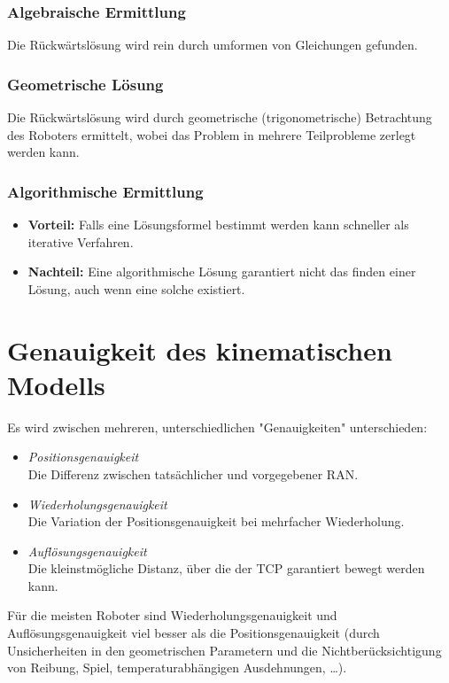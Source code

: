 			\subsubsection{Algebraische Ermittlung}
				Die Rückwärtslösung wird rein durch umformen von Gleichungen gefunden.
			
			\subsubsection{Geometrische Lösung}
				Die Rückwärtslösung wird durch geometrische (\bspw trigonometrische) Betrachtung des Roboters ermittelt, wobei das Problem in mehrere Teilprobleme zerlegt werden kann.
			
			\subsubsection{Algorithmische Ermittlung}
				\begin{itemize}
					\item \textbf{Vorteil:} Falls eine Lösungsformel bestimmt werden kann schneller als iterative Verfahren.
					\item \textbf{Nachteil:} Eine algorithmische Lösung garantiert nicht das finden einer Lösung, auch wenn eine solche existiert.
				\end{itemize}

	\section{Genauigkeit des kinematischen Modells}
		Es wird zwischen mehreren, unterschiedlichen "Genauigkeiten" unterschieden:
		\begin{itemize}
			\item \emph{Positionsgenauigkeit} \\ Die Differenz zwischen tatsächlicher und vorgegebener RAN.
			\item \emph{Wiederholungsgenauigkeit} \\ Die Variation der Positionsgenauigkeit bei mehrfacher Wiederholung.
			\item \emph{Auflösungsgenauigkeit} \\ Die kleinstmögliche Distanz, über die der TCP garantiert bewegt werden kann.
		\end{itemize}
		Für die meisten Roboter sind Wiederholungsgenauigkeit und Auflösungsgenauigkeit viel besser als die Positionsgenauigkeit (\zB durch Unsicherheiten in den geometrischen Parametern und die Nichtberücksichtigung von Reibung, Spiel, temperaturabhängigen Ausdehnungen, \dots).

